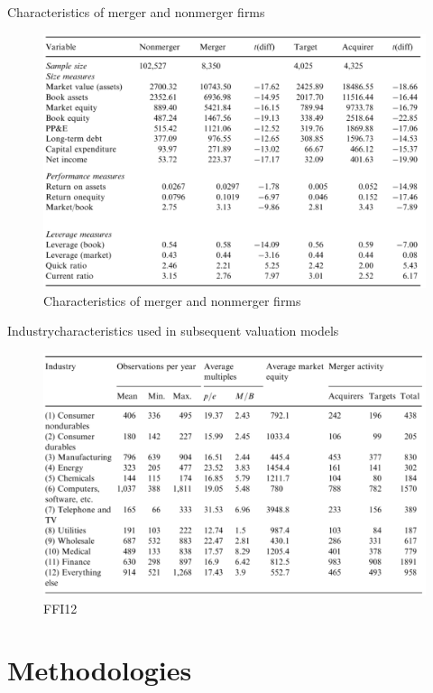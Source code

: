 \documentclass[aspectratio=169,xcolor=dvipsnames]{beamer}
\begin{document}
\begin{frame}{Characteristics of merger and nonmerger firms}
    \begin{figure}
        \includegraphics[width=0.7\linewidth]{figures/p2_table2.png}
        \caption{Characteristics of merger and nonmerger firms}
    \end{figure}
\end{frame}

\begin{frame}{Industrycharacteristics used in subsequent valuation models}
    \begin{figure}
        \includegraphics[width=0.8\linewidth]{figures/p2_table3.png}
        \caption{FFI12}
    \end{figure}
\end{frame}

\section{Methodologies}
\end{document}

